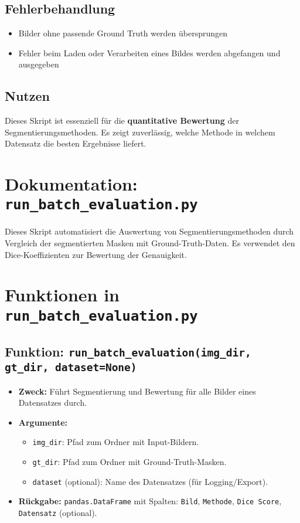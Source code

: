 \documentclass[a4paper,12pt]{article}
\begin{document}
\subsection*{ Fehlerbehandlung}
\begin{itemize}
  \item Bilder ohne passende Ground Truth werden übersprungen
  \item Fehler beim Laden oder Verarbeiten eines Bildes werden abgefangen und ausgegeben
\end{itemize}

\subsection*{ Nutzen}

Dieses Skript ist essenziell für die \textbf{quantitative Bewertung} der Segmentierungsmethoden. Es zeigt zuverlässig, welche Methode in welchem Datensatz die besten Ergebnisse liefert.

\section*{ Dokumentation: \texttt{run\_batch\_evaluation.py}}

Dieses Skript automatisiert die Auswertung von Segmentierungsmethoden durch Vergleich der segmentierten Masken mit Ground-Truth-Daten. Es verwendet den Dice-Koeffizienten zur Bewertung der Genauigkeit.

\section*{ Funktionen in \texttt{run\_batch\_evaluation.py}}

\subsection*{Funktion: \texttt{run\_batch\_evaluation(img\_dir, gt\_dir, dataset=None)}}

\begin{itemize}
  \item \textbf{Zweck:} Führt Segmentierung und Bewertung für alle Bilder eines Datensatzes durch.
  \item \textbf{Argumente:}
    \begin{itemize}
      \item \texttt{img\_dir}: Pfad zum Ordner mit Input-Bildern.
      \item \texttt{gt\_dir}: Pfad zum Ordner mit Ground-Truth-Masken.
      \item \texttt{dataset} (optional): Name des Datensatzes (für Logging/Export).
    \end{itemize}
  \item \textbf{Rückgabe:} \texttt{pandas.DataFrame} mit Spalten: \texttt{Bild}, \texttt{Methode}, \texttt{Dice Score}, \texttt{Datensatz} (optional).
\end{itemize}
\end{document}
